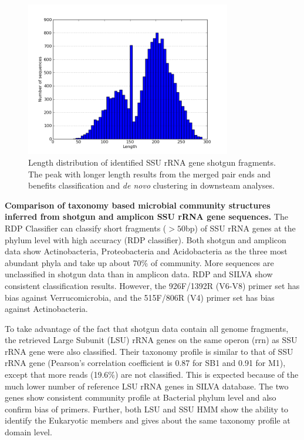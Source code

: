 \documentclass[12pt]{article}
\begin{document}
    \begin{figure}[tbph!]
    \centering
    \includegraphics[width=0.8\textwidth]{figs/read_length_dist.png}
    \caption[Length distribution of identified SSU rRNA gene shotgun fragments]{Length distribution of identified SSU rRNA gene shotgun fragments. The peak with longer length results from the merged pair ends and benefits classification and {\em de novo} clustering in downsteam analyses.}
    \label{fig:read_length_dist}
    \end{figure}

  {\bf Comparison of taxonomy based microbial community structures inferred from shotgun and amplicon SSU rRNA gene sequences. }
The RDP Classifier can classify short fragments ($>50$bp) of SSU rRNA genes at the phylum level with high accuracy (RDP classifier). Both shotgun and amplicon data show Actinobacteria, Proteobacteria and Acidobacteria as the three most abundant phyla and take up about 70\% of community. More sequences are unclassified in shotgun data than in amplicon data. RDP and SILVA show consistent classification results. However, the 926F/1392R (V6-V8) primer set has bias against Verrucomicrobia, and the 515F/806R (V4) primer set has bias against Actinobacteria.

  To take advantage of the fact that shotgun data contain all genome fragments, the retrieved Large Subunit (LSU) rRNA genes on the same operon (rrn) as SSU rRNA gene were also classified. Their taxonomy profile is similar to that of SSU rRNA gene (Pearson’s correlation coefficient is 0.87 for SB1 and 0.91 for M1), except that more reads (19.6\%) are not classified. This is expected because of the much lower number of reference LSU rRNA genes in SILVA database. The two genes show consistent community profile at Bacterial phylum level and also confirm bias of primers. Further, both LSU and SSU HMM show the ability to identify the Eukaryotic members and gives about the same taxonomy profile at domain level.
\end{document}
